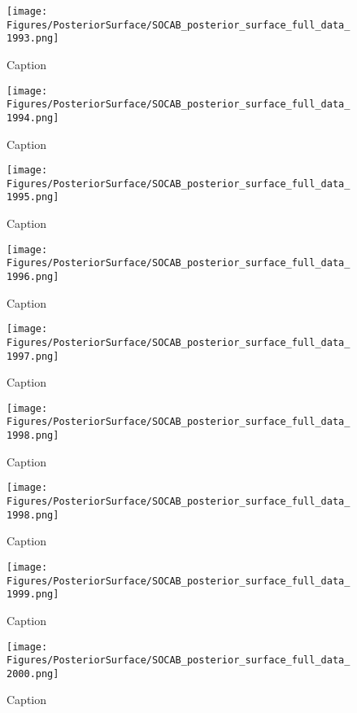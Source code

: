 \begin{figure}
    \centering
    \texttt{[image: Figures/PosteriorSurface/SOCAB\_posterior\_surface\_full\_data\_1993.png]}
    \caption{Caption}
    \label{fig:my_label}
\end{figure}

\begin{figure}
    \centering
    \texttt{[image: Figures/PosteriorSurface/SOCAB\_posterior\_surface\_full\_data\_1994.png]}
    \caption{Caption}
    \label{fig:my_label}
\end{figure}

\begin{figure}
    \centering
    \texttt{[image: Figures/PosteriorSurface/SOCAB\_posterior\_surface\_full\_data\_1995.png]}
    \caption{Caption}
    \label{fig:my_label}
\end{figure}

\begin{figure}
    \centering
    \texttt{[image: Figures/PosteriorSurface/SOCAB\_posterior\_surface\_full\_data\_1996.png]}
    \caption{Caption}
    \label{fig:my_label}
\end{figure}

\begin{figure}
    \centering
    \texttt{[image: Figures/PosteriorSurface/SOCAB\_posterior\_surface\_full\_data\_1997.png]}
    \caption{Caption}
    \label{fig:my_label}
\end{figure}

\begin{figure}
    \centering
    \texttt{[image: Figures/PosteriorSurface/SOCAB\_posterior\_surface\_full\_data\_1998.png]}
    \caption{Caption}
    \label{fig:my_label}
\end{figure}

\begin{figure}
    \centering
    \texttt{[image: Figures/PosteriorSurface/SOCAB\_posterior\_surface\_full\_data\_1998.png]}
    \caption{Caption}
    \label{fig:my_label}
\end{figure}

\begin{figure}
    \centering
    \texttt{[image: Figures/PosteriorSurface/SOCAB\_posterior\_surface\_full\_data\_1999.png]}
    \caption{Caption}
    \label{fig:my_label}
\end{figure}

\begin{figure}
    \centering
    \texttt{[image: Figures/PosteriorSurface/SOCAB\_posterior\_surface\_full\_data\_2000.png]}
    \caption{Caption}
    \label{fig:my_label}
\end{figure}

